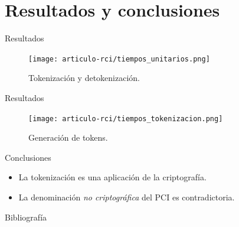 \documentclass{beamer}
\begin{document}
  \section{Resultados y conclusiones}

  \begin{frame}{Resultados}
    \begin{figure}[H]
      \centering
      \texttt{[image: articulo-rci/tiempos\_unitarios.png]}
      \caption{Tokenización y detokenización.}
    \end{figure}
  \end{frame}

  \begin{frame}{Resultados}
    \begin{figure}[H]
      \centering
      \texttt{[image: articulo-rci/tiempos\_tokenizacion.png]}
      \caption{Generación de tokens.}
    \end{figure}
  \end{frame}

  \begin{frame}{Conclusiones}
    \begin{itemize}
      \item La tokenización es una aplicación de la criptografía.
      \item La denominación \textit{no criptográfica} del PCI es contradictoria.
    \end{itemize}
  \end{frame}

  \begin{frame}[allowframebreaks]{Bibliografía}
    \printbibliography
  \end{frame}

  \setlength{\parskip}{0.0em}

  {
  \frame{\titlepage}}
\end{document}

